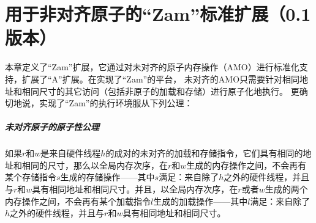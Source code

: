 \chapter{用于非对齐原子的“Zam”标准扩展（0.1版本）}
\label{sec:zam}

本章定义了“Zam”扩展，它通过对未对齐的原子内存操作（AMO）进行标准化支持，扩展了“A”扩展。在实现了“Zam”的平台，
未对齐的AMO只需要针对相同地址和相同尺寸的其它访问（包括非原子的加载和存储）进行原子化地执行。
更确切地说，实现了“Zam”的执行环境服从下列公理：

\newcommand{\misalignedatomicityaxiom}{
  如果$r$和$w$是来自硬件线程$h$的成对的未对齐的加载和存储指令，它们具有相同的地址和相同的尺寸，那么以全局内存次序，在$r$和$w$生成的内存操作之间，不会再有某个存储指令$s$生成的存储操作——其中$s$满足：来自除了$h$之外的硬件线程，并且与$r$和$w$具有相同地址和相同尺寸。并且，以全局内存次序，在$r$或者$w$生成的两个内存操作之间，不会再有某个加载指令$l$生成的加载操作——其中$l$满足：来自除了$h$之外的硬件线程，并且与$r$和$w$具有相同地址和相同尺寸。
  }

\vspace{-0.2in}
\paragraph{未对齐原子的原子性公理  
}
\label{rvwmo:ax:misaligned}
\misalignedatomicityaxiom

